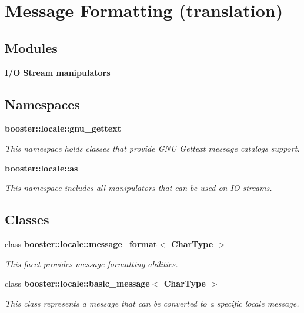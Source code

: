\section{Message Formatting (translation)}
\label{group__message}
\subsection*{Modules}
\begin{DoxyCompactItemize}
\item 
{\bf I/\+O Stream manipulators}
\end{DoxyCompactItemize}
\subsection*{Namespaces}
\begin{DoxyCompactItemize}
\item 
 {\bf booster\+::locale\+::gnu\+\_\+gettext}
\begin{DoxyCompactList}\small\item\em This namespace holds classes that provide G\+NU Gettext message catalogs support. \end{DoxyCompactList}\item 
 {\bf booster\+::locale\+::as}
\begin{DoxyCompactList}\small\item\em This namespace includes all manipulators that can be used on IO streams. \end{DoxyCompactList}\end{DoxyCompactItemize}
\subsection*{Classes}
\begin{DoxyCompactItemize}
\item 
class {\bf booster\+::locale\+::message\+\_\+format$<$ Char\+Type $>$}
\begin{DoxyCompactList}\small\item\em This facet provides message formatting abilities. \end{DoxyCompactList}\item 
class {\bf booster\+::locale\+::basic\+\_\+message$<$ Char\+Type $>$}
\begin{DoxyCompactList}\small\item\em This class represents a message that can be converted to a specific locale message. \end{DoxyCompactList}\end{DoxyCompactItemize}
